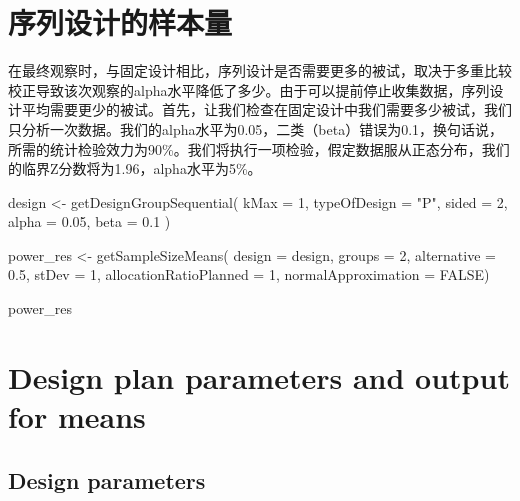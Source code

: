 \documentclass[
  letterpaper,
  DIV=11,
  numbers=noendperiod]{scrreprt}
\newenvironment{Shaded}{\begin{snugshade}}{\end{snugshade}}
\newcommand{\AttributeTok}[1]{\textcolor[rgb]{0.40,0.45,0.13}{#1}}
\newcommand{\ConstantTok}[1]{\textcolor[rgb]{0.56,0.35,0.01}{#1}}
\newcommand{\DecValTok}[1]{\textcolor[rgb]{0.68,0.00,0.00}{#1}}
\newcommand{\FloatTok}[1]{\textcolor[rgb]{0.68,0.00,0.00}{#1}}
\newcommand{\FunctionTok}[1]{\textcolor[rgb]{0.28,0.35,0.67}{#1}}
\newcommand{\NormalTok}[1]{\textcolor[rgb]{0.00,0.23,0.31}{#1}}
\newcommand{\OtherTok}[1]{\textcolor[rgb]{0.00,0.23,0.31}{#1}}
\newcommand{\StringTok}[1]{\textcolor[rgb]{0.13,0.47,0.30}{#1}}
\begin{document}
\hypertarget{ux5e8fux5217ux8bbeux8ba1ux7684ux6837ux672cux91cf}{%
\section{序列设计的样本量}\label{ux5e8fux5217ux8bbeux8ba1ux7684ux6837ux672cux91cf}}

在最终观察时，与固定设计相比，序列设计是否需要更多的被试，取决于多重比较校正导致该次观察的alpha水平降低了多少。由于可以提前停止收集数据，序列设计平均需要更少的被试。首先，让我们检查在固定设计中我们需要多少被试，我们只分析一次数据。我们的alpha水平为0.05，二类（beta）错误为0.1，换句话说，所需的统计检验效力为90\%。我们将执行一项检验，假定数据服从正态分布，我们的临界Z分数将为1.96，alpha水平为5\%。

\begin{Shaded}
\begin{Highlighting}[]
\NormalTok{design }\OtherTok{\textless{}{-}} \FunctionTok{getDesignGroupSequential}\NormalTok{(}
  \AttributeTok{kMax =} \DecValTok{1}\NormalTok{,}
  \AttributeTok{typeOfDesign =} \StringTok{"P"}\NormalTok{,}
  \AttributeTok{sided =} \DecValTok{2}\NormalTok{,}
  \AttributeTok{alpha =} \FloatTok{0.05}\NormalTok{,}
  \AttributeTok{beta =} \FloatTok{0.1}
\NormalTok{)}

\NormalTok{power\_res }\OtherTok{\textless{}{-}} \FunctionTok{getSampleSizeMeans}\NormalTok{(}
  \AttributeTok{design =}\NormalTok{ design,}
  \AttributeTok{groups =} \DecValTok{2}\NormalTok{,}
  \AttributeTok{alternative =} \FloatTok{0.5}\NormalTok{, }
  \AttributeTok{stDev =} \DecValTok{1}\NormalTok{, }
  \AttributeTok{allocationRatioPlanned =} \DecValTok{1}\NormalTok{,}
  \AttributeTok{normalApproximation =} \ConstantTok{FALSE}\NormalTok{)}

\NormalTok{power\_res}
\end{Highlighting}
\end{Shaded}

\hypertarget{design-plan-parameters-and-output-for-means}{%
\section{Design plan parameters and output for
means}\label{design-plan-parameters-and-output-for-means}}

\hypertarget{design-parameters}{%
\subsection{Design parameters}\label{design-parameters}}
\end{document}
